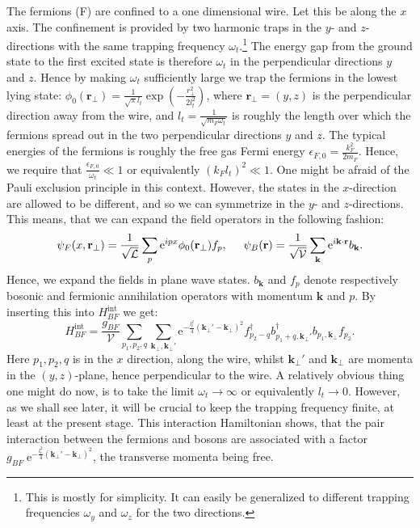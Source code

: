 The fermions (F) are confined to a one dimensional wire. Let this be along the $x$ axis. The confinement is provided by two harmonic traps in the $y$- and $z$-directions with the same trapping frequency $\omega_t$.\footnote{This is mostly for simplicity. It can easily be generalized to different trapping frequencies $\omega_y$ and $\omega_z$ for the two directions.} The energy gap from the ground state to the first excited state is therefore $\omega_t$ in the perpendicular directions $y$ and $z$. Hence by making $\omega_t$ sufficiently large we trap the fermions in the lowest lying state: $\phi_0(\mathbf{r}_\perp) = \frac{1}{\sqrt{\pi}l_t}\exp\left(-\frac{r_\perp^2}{2l_t^2}\right)$, where $\mathbf{r}_\perp = (y,z)$ is the perpendicular direction away from the wire, and $l_t = \frac{1}{\sqrt{m_F \omega_t}}$ is roughly the length over which the fermions spread out in the two perpendicular directions $y$ and $z$. The typical energies of the fermions is roughly the free gas Fermi energy $\epsilon_{F,0} = \frac{k_F^2}{2m_F}$. Hence, we require that $\frac{\epsilon_{F,0}}{\omega_t} \ll 1$ or equivalently $(k_Fl_t)^2\ll 1$. One might be afraid of the Pauli exclusion principle in this context. However, the states in the $x$-direction are allowed to be different, and so we can symmetrize in the $y$- and $z$-directions. This means, that we can expand the field operators in the following fashion:
\begin{equation}
\psi_F(x,\mathbf{r}_\perp) = \frac{1}{\sqrt{\mathcal{L}}}\sum_p \text{e}^{ipx} \phi_0(\mathbf{r}_\perp) f_p, \hspace{0.5cm} \psi_B(\mathbf{r}) = \frac{1}{\sqrt{\mathcal{V}}}\sum_{\mathbf{k}} \text{e}^{i\mathbf{k}\cdot \mathbf{r}} b_\mathbf{k}. 
\end{equation}   
Hence, we expand the fields in plane wave states. $b_\mathbf{k}$ and $f_p$ denote respectively bosonic and fermionic annihilation operators with momentum $\mathbf{k}$ and $p$.  By inserting this into $H_{BF}^\text{int}$ we get:
\begin{equation}
H_{BF}^\text{int} = \frac{g_{BF}}{\mathcal{V}}\sum_{p_1,p_2,q} \sum_{\mathbf{k}_\perp, \mathbf{k}_\perp'} \text{e}^{-\frac{l_t^2}{4}(\mathbf{k}_\perp'-\mathbf{k}_\perp)^2} f_{p_2-q}^\dagger b_{p_1+q, \mathbf{k}_\perp'}^\dagger b_{p_1,\mathbf{k}_\perp}f_{p_2}.
\end{equation}
Here  $p_1,p_2,q$ is in the $x$ direction, along the wire, whilst $\mathbf{k}_\perp'$ and $\mathbf{k}_\perp$ are momenta in the $(y,z)$-plane, hence perpendicular to the wire. A relatively obvious thing one might do now, is to take the limit $\omega_t \to \infty$ or equivalently $l_t \to 0$. However, as we shall see later, it will be crucial to keep the trapping frequency finite, at least at the present stage. This interaction Hamiltonian shows, that the pair interaction between the fermions and bosons are associated with a factor $g_{BF}\; \text{e}^{-\frac{l_t^2}{4}(\mathbf{k}_\perp'-\mathbf{k}_\perp)^2}$, the transverse momenta being free. 

